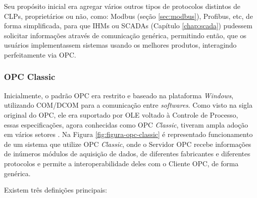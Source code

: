         Seu propósito inicial era agregar vários outros tipos de protocolos distintos de \glspl{CLP}, proprietários ou não, como: Modbus (seção \ref{sec:modbus}), Profibus, etc, de forma simplificada, para que \glspl{IHM} ou SCADAs (Capítulo \ref{chap:scada}) pudessem solicitar informações através de comunicação genérica, permitindo então, que os usuários implementassem sistemas usando os melhores produtos, interagindo perfeitamente via \gls{OPC}.

    \subsubsection{OPC Classic}
    \label{sec:opc-classic}

        Inicialmente, o padrão \gls{OPC} era restrito e baseado na plataforma \textit{Windows}, utilizando \gls{COM/DCOM} para a comunicação entre \textit{softwares}. Como visto na sigla original do \gls{OPC}, ele era suportado por \gls{OLE} voltado à Controle de Processo, essas especificações, agora conhecidas como \gls{OPC} \textit{Classic}, tiveram ampla adoção em vários setores \cite{OPCClassic}. Na Figura \ref{fig:figura-opc-classic} é representado funcionamento de um sistema que utilize \gls{OPC} \textit{Classic}, onde o Servidor \gls{OPC} recebe informações de inúmeros módulos de aquisição de dados, de diferentes fabricantes e diferentes protocolos e permite a interoperabilidade deles com o Cliente \gls{OPC}, de forma genérica.
                
        \begin{figure}[!h]
	    \end{figure}
	    
	    Existem três definições principais:
        
